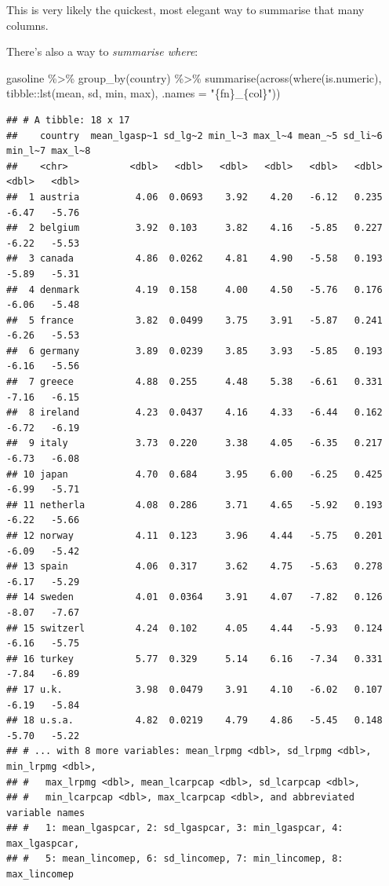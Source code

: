 \documentclass[
]{article}
\newenvironment{Shaded}{\begin{snugshade}}{\end{snugshade}}
\newcommand{\AttributeTok}[1]{\textcolor[rgb]{0.77,0.63,0.00}{#1}}
\newcommand{\FunctionTok}[1]{\textcolor[rgb]{0.00,0.00,0.00}{#1}}
\newcommand{\NormalTok}[1]{#1}
\newcommand{\SpecialCharTok}[1]{\textcolor[rgb]{0.00,0.00,0.00}{#1}}
\newcommand{\StringTok}[1]{\textcolor[rgb]{0.31,0.60,0.02}{#1}}
\begin{document}
This is very likely the quickest, most elegant way to summarise that many columns.

There's also a way to \emph{summarise where}:

\begin{Shaded}
\begin{Highlighting}[]
\NormalTok{gasoline }\SpecialCharTok{\%\textgreater{}\%}
  \FunctionTok{group\_by}\NormalTok{(country) }\SpecialCharTok{\%\textgreater{}\%}
  \FunctionTok{summarise}\NormalTok{(}\FunctionTok{across}\NormalTok{(}\FunctionTok{where}\NormalTok{(is.numeric), tibble}\SpecialCharTok{::}\FunctionTok{lst}\NormalTok{(mean, sd, min, max), }\AttributeTok{.names =} \StringTok{"\{fn\}\_\{col\}"}\NormalTok{))}
\end{Highlighting}
\end{Shaded}

\begin{verbatim}
## # A tibble: 18 x 17
##    country  mean_lgasp~1 sd_lg~2 min_l~3 max_l~4 mean_~5 sd_li~6 min_l~7 max_l~8
##    <chr>           <dbl>   <dbl>   <dbl>   <dbl>   <dbl>   <dbl>   <dbl>   <dbl>
##  1 austria          4.06  0.0693    3.92    4.20   -6.12   0.235   -6.47   -5.76
##  2 belgium          3.92  0.103     3.82    4.16   -5.85   0.227   -6.22   -5.53
##  3 canada           4.86  0.0262    4.81    4.90   -5.58   0.193   -5.89   -5.31
##  4 denmark          4.19  0.158     4.00    4.50   -5.76   0.176   -6.06   -5.48
##  5 france           3.82  0.0499    3.75    3.91   -5.87   0.241   -6.26   -5.53
##  6 germany          3.89  0.0239    3.85    3.93   -5.85   0.193   -6.16   -5.56
##  7 greece           4.88  0.255     4.48    5.38   -6.61   0.331   -7.16   -6.15
##  8 ireland          4.23  0.0437    4.16    4.33   -6.44   0.162   -6.72   -6.19
##  9 italy            3.73  0.220     3.38    4.05   -6.35   0.217   -6.73   -6.08
## 10 japan            4.70  0.684     3.95    6.00   -6.25   0.425   -6.99   -5.71
## 11 netherla         4.08  0.286     3.71    4.65   -5.92   0.193   -6.22   -5.66
## 12 norway           4.11  0.123     3.96    4.44   -5.75   0.201   -6.09   -5.42
## 13 spain            4.06  0.317     3.62    4.75   -5.63   0.278   -6.17   -5.29
## 14 sweden           4.01  0.0364    3.91    4.07   -7.82   0.126   -8.07   -7.67
## 15 switzerl         4.24  0.102     4.05    4.44   -5.93   0.124   -6.16   -5.75
## 16 turkey           5.77  0.329     5.14    6.16   -7.34   0.331   -7.84   -6.89
## 17 u.k.             3.98  0.0479    3.91    4.10   -6.02   0.107   -6.19   -5.84
## 18 u.s.a.           4.82  0.0219    4.79    4.86   -5.45   0.148   -5.70   -5.22
## # ... with 8 more variables: mean_lrpmg <dbl>, sd_lrpmg <dbl>, min_lrpmg <dbl>,
## #   max_lrpmg <dbl>, mean_lcarpcap <dbl>, sd_lcarpcap <dbl>,
## #   min_lcarpcap <dbl>, max_lcarpcap <dbl>, and abbreviated variable names
## #   1: mean_lgaspcar, 2: sd_lgaspcar, 3: min_lgaspcar, 4: max_lgaspcar,
## #   5: mean_lincomep, 6: sd_lincomep, 7: min_lincomep, 8: max_lincomep
\end{verbatim}
\end{document}
